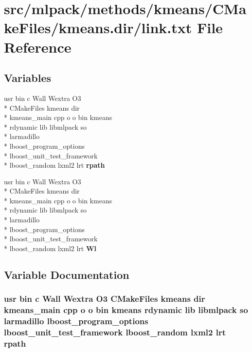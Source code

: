 \section{src/mlpack/methods/kmeans/\-C\-Make\-Files/kmeans.dir/link.txt File Reference}
\label{methods_2kmeans_2CMakeFiles_2kmeans_8dir_2link_8txt}
\subsection*{Variables}
\begin{DoxyCompactItemize}
\item 
usr bin c Wall Wextra O3 \\*
C\-Make\-Files kmeans dir \\*
kmeans\-\_\-main cpp o o bin kmeans \\*
rdynamic lib libmlpack so \\*
larmadillo \\*
lboost\-\_\-program\-\_\-options \\*
lboost\-\_\-unit\-\_\-test\-\_\-framework \\*
lboost\-\_\-random lxml2 lrt {\bf rpath}
\item 
usr bin c Wall Wextra O3 \\*
C\-Make\-Files kmeans dir \\*
kmeans\-\_\-main cpp o o bin kmeans \\*
rdynamic lib libmlpack so \\*
larmadillo \\*
lboost\-\_\-program\-\_\-options \\*
lboost\-\_\-unit\-\_\-test\-\_\-framework \\*
lboost\-\_\-random lxml2 lrt {\bf Wl}
\end{DoxyCompactItemize}


\subsection{Variable Documentation}
\subsubsection[{rpath}]{\setlength{\rightskip}{0pt plus 5cm}usr bin c Wall Wextra O3 C\-Make\-Files kmeans dir kmeans\-\_\-main cpp o o bin kmeans rdynamic lib libmlpack so larmadillo lboost\-\_\-program\-\_\-options lboost\-\_\-unit\-\_\-test\-\_\-framework lboost\-\_\-random lxml2 lrt rpath}\label{methods_2kmeans_2CMakeFiles_2kmeans_8dir_2link_8txt_ad8646468f637ad2aa746918b35fc7dbb}


